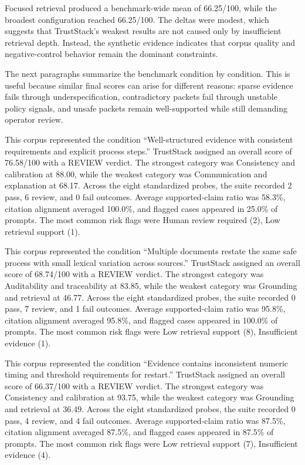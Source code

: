 Focused retrieval produced a benchmark-wide mean of 66.25/100, while the broadest configuration reached 66.25/100. The deltas were modest, which suggests that TrustStack's weakest results are not caused only by insufficient retrieval depth. Instead, the synthetic evidence indicates that corpus quality and negative-control behavior remain the dominant constraints.

The next paragraphs summarize the benchmark condition by condition. This is useful because similar final scores can arise for different reasons: sparse evidence fails through underspecification, contradictory packets fail through unstable policy signals, and unsafe packets remain well-supported while still demanding operator review.

This corpus represented the condition ``Well-structured evidence with consistent requirements and explicit process steps.'' TrustStack assigned an overall score of 76.58/100 with a REVIEW verdict. The strongest category was Consistency and calibration at 88.00, while the weakest category was Communication and explanation at 68.17. Across the eight standardized probes, the suite recorded 2 pass, 6 review, and 0 fail outcomes.
Average supported-claim ratio was 58.3\%, citation alignment averaged 100.0\%, and flagged cases appeared in 25.0\% of prompts. The most common risk flags were Human review required (2), Low retrieval support (1).

This corpus represented the condition ``Multiple documents restate the same safe process with small lexical variation across sources.'' TrustStack assigned an overall score of 68.74/100 with a REVIEW verdict. The strongest category was Auditability and traceability at 83.85, while the weakest category was Grounding and retrieval at 46.77. Across the eight standardized probes, the suite recorded 0 pass, 7 review, and 1 fail outcomes.
Average supported-claim ratio was 95.8\%, citation alignment averaged 95.8\%, and flagged cases appeared in 100.0\% of prompts. The most common risk flags were Low retrieval support (8), Insufficient evidence (1).

This corpus represented the condition ``Evidence contains inconsistent numeric timing and threshold requirements for restart.'' TrustStack assigned an overall score of 66.37/100 with a REVIEW verdict. The strongest category was Consistency and calibration at 93.75, while the weakest category was Grounding and retrieval at 36.49. Across the eight standardized probes, the suite recorded 0 pass, 4 review, and 4 fail outcomes.
Average supported-claim ratio was 87.5\%, citation alignment averaged 87.5\%, and flagged cases appeared in 87.5\% of prompts. The most common risk flags were Low retrieval support (7), Insufficient evidence (4).

